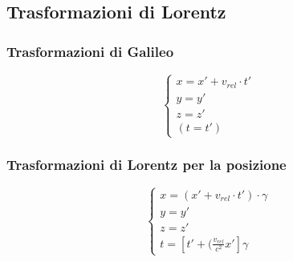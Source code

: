     \subsection{Trasformazioni di Lorentz}
	\subsubsection{Trasformazioni di Galileo}
	\begin{equation*}
	\begin{cases}
	x=x'+v_{rel}\cdot t'\\
	y=y'\\
	z=z'\\
	(t=t')
	\end{cases}
	\end{equation*}
	\subsubsection{Trasformazioni di Lorentz per la posizione}
	\begin{equation}
	\begin{cases}
	x=(x'+v_{rel}\cdot t')\cdot\gamma\\
	y=y'\\
	z=z'\\
	t=[t'+(\frac{v_{rel}}{c^2}x']\gamma
	\end{cases}
	\end{equation}

